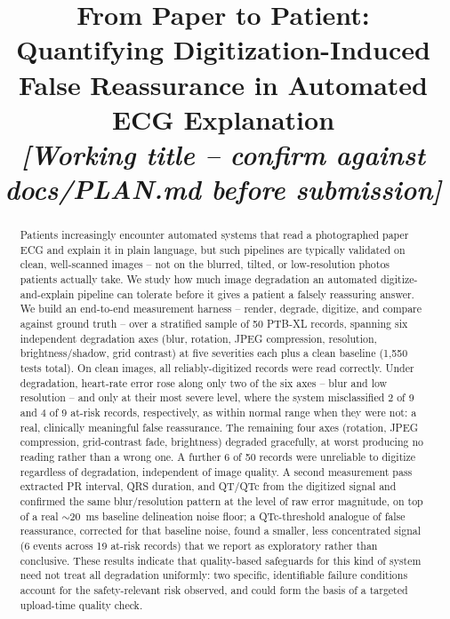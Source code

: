 \documentclass[conference]{IEEEtran}
\begin{document}
\title{From Paper to Patient: Quantifying Digitization-Induced False Reassurance in Automated ECG Explanation\\
\large \textit{[Working title -- confirm against docs/PLAN.md before submission]}}

\author{
}

\maketitle

\begin{abstract}
Patients increasingly encounter automated systems that read a photographed paper ECG
and explain it in plain language, but such pipelines are typically validated on
clean, well-scanned images -- not on the blurred, tilted, or low-resolution photos
patients actually take. We study how much image degradation an automated
digitize-and-explain pipeline can tolerate before it gives a patient a falsely
reassuring answer. We build an end-to-end measurement harness -- render, degrade,
digitize, and compare against ground truth -- over a stratified sample of 50 PTB-XL
records, spanning six independent degradation axes (blur, rotation, JPEG compression,
resolution, brightness/shadow, grid contrast) at five severities each plus a clean
baseline (1{,}550 tests total). On clean images, all reliably-digitized records were
read correctly. Under degradation, heart-rate error rose along only two of the six
axes -- blur and low resolution -- and only at their most severe level, where the
system misclassified 2 of 9 and 4 of 9 at-risk records, respectively, as within
normal range when they were not: a real, clinically meaningful false reassurance. The
remaining four axes (rotation, JPEG compression, grid-contrast fade, brightness)
degraded gracefully, at worst producing no reading rather than a wrong one. A further
6 of 50 records were unreliable to digitize regardless of degradation, independent of
image quality. A second measurement pass extracted PR interval, QRS duration, and
QT/QTc from the digitized signal and confirmed the same blur/resolution pattern at
the level of raw error magnitude, on top of a real $\sim$20~ms baseline delineation
noise floor; a QTc-threshold analogue of false reassurance, corrected for that
baseline noise, found a smaller, less concentrated signal (6 events across 19
at-risk records) that we report as exploratory rather than conclusive. These results
indicate that quality-based safeguards for this kind of system need not treat all
degradation uniformly: two specific, identifiable failure conditions account for the
safety-relevant risk observed, and could form the basis of a targeted upload-time
quality check.
\end{abstract}
\end{document}
